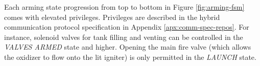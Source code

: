 Each arming state progression from top to bottom in Figure \ref{fig:arming-fsm} comes with elevated privileges.
Privileges are described in the hybrid communication protocol specification in Appendix \ref{apx:comm-spec-repos}. For
instance, solenoid valves for tank filling and venting can be controlled in the \textit{VALVES ARMED} state and higher.
\cite{hybrid-comms} Opening the main fire valve (which allows the oxidizer to flow onto the lit igniter) is only
permitted in the \textit{LAUNCH} state.
